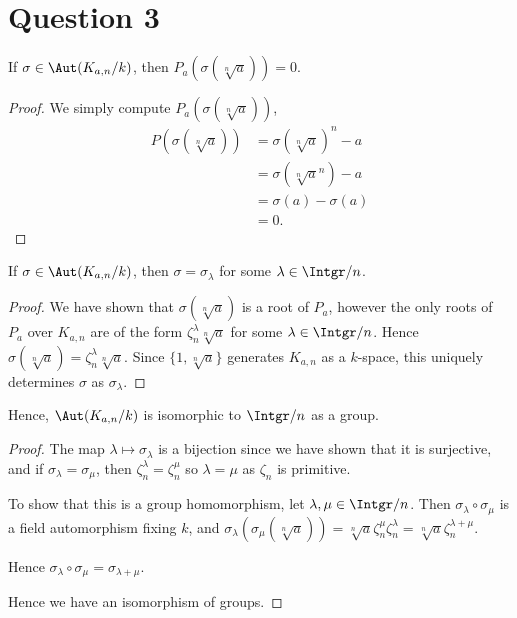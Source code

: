 \documentclass{unswmaths}
\begin{document}
\section*{Question 3}
\begin{lemma}
    If $\sigma \in \Aut(K_{a,n}/k)$, then $P_a(\sigma(\sqrt[n]{a})) = 0$.
\end{lemma}
\begin{proof}
    We simply compute $P_a(\sigma(\sqrt[n]{a}))$,
    \begin{align*}
        P(\sigma(\sqrt[n]{a})) &= \sigma(\sqrt[n]{a})^n-a\\
        &= \sigma(\sqrt[n]{a}^n)-a\\
        &= \sigma(a)-\sigma(a)\\
        &= 0.
    \end{align*}
\end{proof}
\begin{lemma}
    If $\sigma \in \Aut(K_{a,n}/k)$, then $\sigma = \sigma_\lambda$ for some $\lambda \in \Intgr/n$. 
\end{lemma}
\begin{proof}
    We have shown that $\sigma(\sqrt[n]{a})$ is a root of $P_a$, however the only roots of $P_{a}$ over
    $K_{a,n}$ are of the form $\zeta_{n}^\lambda \sqrt[n]{a}$ for some $\lambda \in \Intgr/n$. 
    Hence $\sigma(\sqrt[n]{a}) = \zeta_n^\lambda \sqrt[n]{a}$. Since $\{1,\sqrt[n]{a}\}$
    generates $K_{a,n}$ as a $k$-space, this uniquely determines $\sigma$ as $\sigma_\lambda$.
\end{proof}
\begin{theorem}
    Hence, $\Aut(K_{a,n}/k)$ is isomorphic to $\Intgr/n$ as a group.
\end{theorem}
\begin{proof}
    The map $\lambda \mapsto \sigma_\lambda$ is a bijection since we
    have shown that it is surjective, and if $\sigma_\lambda = \sigma_\mu$, then
    $\zeta_n^\lambda = \zeta_n^\mu$ so $\lambda = \mu$ as $\zeta_n$ is primitive.
    
    To show that this is a group homomorphism, let $\lambda,\mu \in \Intgr/n$.
    Then $\sigma_\lambda\circ\sigma_\mu$ is a field automorphism fixing $k$,
    and $\sigma_\lambda(\sigma_\mu(\sqrt[n]{a})) = \sqrt[n]{a}\zeta_n^\mu\zeta_n^\lambda = \sqrt[n]{a}\zeta_n^{\lambda+\mu}$.
    
    Hence $\sigma_\lambda\circ \sigma_\mu = \sigma_{\lambda+\mu}$.
    
    Hence we have an isomorphism of groups.
\end{proof} 
    
\end{document}
